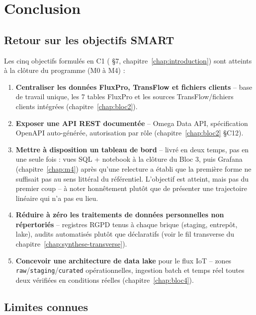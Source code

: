 \chapter{Conclusion}
\label{chap:conclusion}

\section{Retour sur les objectifs SMART}

Les cinq objectifs formulés en C1
( §7,
chapitre~\ref{chap:introduction}) sont atteints à la clôture du
programme (M0 à M4) :

\begin{enumerate}
  \item \textbf{Centraliser les données FluxPro, TransFlow et fichiers
    clients} -- base de travail unique, les 7 tables FluxPro et les
    sources TransFlow/fichiers clients intégrées (chapitre~\ref{chap:bloc2}).
  \item \textbf{Exposer une API REST documentée} -- Omega Data API,
    spécification OpenAPI auto-générée, autorisation par rôle
    (chapitre~\ref{chap:bloc2} §C12).
  \item \textbf{Mettre à disposition un tableau de bord} -- livré en
    deux temps, pas en une seule fois : vues SQL + notebook à la
    clôture du Bloc 3, puis Grafana (chapitre~\ref{chap:m4}) après
    qu'une relecture a établi que la première forme ne suffisait pas
    au sens littéral du référentiel. L'objectif est atteint, mais pas
    du premier coup -- à noter honnêtement plutôt que de présenter une
    trajectoire linéaire qui n'a pas eu lieu.
  \item \textbf{Réduire à zéro les traitements de données personnelles
    non répertoriés} -- registres RGPD tenus à chaque brique (staging,
    entrepôt, lake), audits automatisés plutôt que déclaratifs (voir
    le fil transverse du chapitre~\ref{chap:synthese-transverse}).
  \item \textbf{Concevoir une architecture de data lake} pour le flux
    IoT -- zones \texttt{raw}/\texttt{staging}/\texttt{curated}
    opérationnelles, ingestion batch et temps réel toutes deux vérifiées
    en conditions réelles (chapitre~\ref{chap:bloc4}).
\end{enumerate}

\section{Limites connues}

